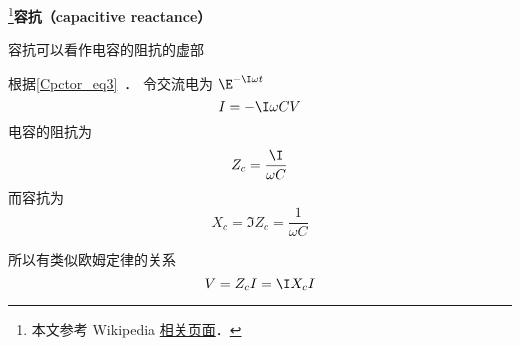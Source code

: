 
\begin{issues}
\issueDraft
\end{issues}


\footnote{本文参考 Wikipedia \href{https://en.wikipedia.org/wiki/Electrical_reactance}{相关页面}．}\textbf{容抗（capacitive reactance）}

容抗可以看作电容的阻抗的虚部

根据\autoref{Cpctor_eq3}~． 令交流电为 $\E^{-\I \omega t}$
\begin{equation}
I = -\I \omega CV
\end{equation}
电容的阻抗为
\begin{equation}
Z_c = \frac{\I}{\omega C}
\end{equation}
而容抗为
\begin{equation}
X_c = \Im{Z_c} = \frac{1}{\omega C}
\end{equation}

所以有类似欧姆定律的关系
\begin{equation}
V = Z_c I = \I X_c I
\end{equation}
